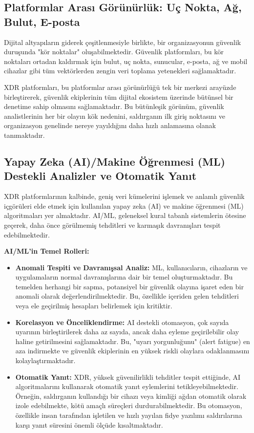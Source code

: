 \subsection{Platformlar Arası Görünürlük: Uç Nokta, Ağ, Bulut, E-posta}

Dijital altyapıların giderek çeşitlenmesiyle birlikte, bir organizasyonun güvenlik duruşunda "kör noktalar" oluşabilmektedir. Güvenlik platformları, bu kör noktaları ortadan kaldırmak için bulut, uç nokta, sunucular, e-posta, ağ ve mobil cihazlar gibi tüm vektörlerden zengin veri toplama yetenekleri sağlamaktadır.

XDR platformları, bu platformlar arası görünürlüğü tek bir merkezi arayüzde birleştirerek, güvenlik ekiplerinin tüm dijital ekosistem üzerinde bütünsel bir denetime sahip olmasını sağlamaktadır. Bu bütünleşik görünüm, güvenlik analistlerinin her bir olayın kök nedenini, saldırganın ilk giriş noktasını ve organizasyon genelinde nereye yayıldığını daha hızlı anlamasına olanak tanımaktadır.

\subsection{Yapay Zeka (AI)/Makine Öğrenmesi (ML) Destekli Analizler ve Otomatik Yanıt}
XDR platformlarının kalbinde, geniş veri kümelerini işlemek ve anlamlı güvenlik içgörüleri elde etmek için kullanılan yapay zeka (AI) ve makine öğrenmesi (ML) algoritmaları yer almaktadır. AI/ML, geleneksel kural tabanlı sistemlerin ötesine geçerek, daha önce görülmemiş tehditleri ve karmaşık davranışları tespit edebilmektedir.

\textbf{AI/ML'in Temel Rolleri:}
\begin{itemize}
    \item \textbf{Anomali Tespiti ve Davranışsal Analiz:} ML, kullanıcıların, cihazların ve uygulamaların normal davranışlarına dair bir temel oluşturmaktadır. Bu temelden herhangi bir sapma, potansiyel bir güvenlik olayına işaret eden bir anomali olarak değerlendirilmektedir. Bu, özellikle içeriden gelen tehditleri veya ele geçirilmiş hesapları belirlemek için kritiktir.
    \item \textbf{Korelasyon ve Önceliklendirme:} AI destekli otomasyon, çok sayıda uyarının birleştirilerek daha az sayıda, ancak daha eyleme geçirilebilir olay haline getirilmesini sağlamaktadır. Bu, "uyarı yorgunluğunu" (alert fatigue) en aza indirmekte ve güvenlik ekiplerinin en yüksek riskli olaylara odaklanmasını kolaylaştırmaktadır.
    \item \textbf{Otomatik Yanıt:} XDR, yüksek güvenilirlikli tehditler tespit ettiğinde, AI algoritmalarını kullanarak otomatik yanıt eylemlerini tetikleyebilmektedir. Örneğin, saldırganın kullandığı bir cihazı veya kimliği ağdan otomatik olarak izole edebilmekte, kötü amaçlı süreçleri durdurabilmektedir. Bu otomasyon, özellikle insan tarafından işletilen ve hızlı yayılan fidye yazılımı saldırılarına karşı yanıt süresini önemli ölçüde kısaltmaktadır.
\end{itemize}

